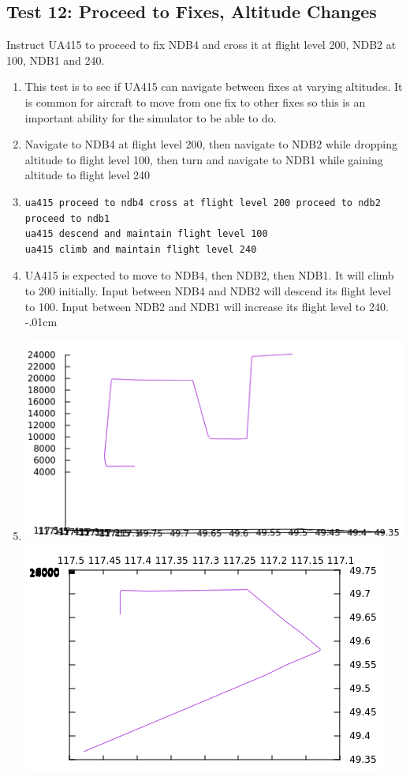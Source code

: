 \documentclass[letterpaper, 12pt]{article}
\begin{document}
\subsection{Test 12: Proceed to Fixes, Altitude Changes}
Instruct UA415 to proceed to fix NDB4 and cross it at flight level 200, NDB2 at 100, NDB1 and 240.
\begin{enumerate}\itemsep-.15cm
\item This test is to see if UA415 can navigate between fixes at varying altitudes. It is common for aircraft to move from one fix to other fixes so this is an important ability for the simulator to be able to do.
\item Navigate to NDB4 at flight level 200, then navigate to NDB2 while dropping altitude to flight level 100, then turn and navigate to NDB1 while gaining altitude to flight level 240
\item \begin{lstlisting}
ua415 proceed to ndb4 cross at flight level 200 proceed to ndb2 proceed to ndb1
ua415 descend and maintain flight level 100
ua415 climb and maintain flight level 240
\end{lstlisting}
\item UA415 is expected to move to NDB4, then NDB2, then NDB1. It will climb to 200 initially. Input between NDB4 and NDB2 will descend its flight level to 100. Input between NDB2 and NDB1 will increase its flight level to 240.
\itemsep-.01cm
\item \includegraphics[scale=.6,valign=t]{test12_1.png} \includegraphics[scale=.6,valign=t]{test12_2.png}

\end{enumerate}
\end{document}
